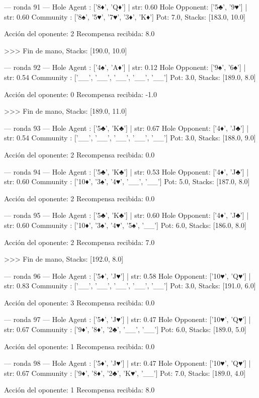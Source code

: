 --- ronda 91 ---
Hole Agent : ['8♦', 'Q♦'] | str: 0.60
Hole Opponent: ['5♣', '9♥'] | str: 0.60
Community  : ['8♠', '5♥', '7♥', '3♦', 'K♦']
Pot: 7.0, Stacks: [183.0, 10.0]

Acción del oponente: 2
Recompensa recibida: 8.0

>>> Fin de mano, Stacks: [190.0, 10.0]


--- ronda 92 ---
Hole Agent : ['4♠', 'A♦'] | str: 0.12
Hole Opponent: ['9♠', '6♠'] | str: 0.54
Community  : ['__', '__', '__', '__', '__']
Pot: 3.0, Stacks: [189.0, 8.0]

Acción del oponente: 0
Recompensa recibida: -1.0

>>> Fin de mano, Stacks: [189.0, 11.0]


--- ronda 93 ---
Hole Agent : ['5♣', 'K♣'] | str: 0.67
Hole Opponent: ['4♦', 'J♣'] | str: 0.54
Community  : ['__', '__', '__', '__', '__']
Pot: 3.0, Stacks: [188.0, 9.0]

Acción del oponente: 2
Recompensa recibida: 0.0

--- ronda 94 ---
Hole Agent : ['5♣', 'K♣'] | str: 0.53
Hole Opponent: ['4♦', 'J♣'] | str: 0.60
Community  : ['10♦', '3♠', '4♥', '__', '__']
Pot: 5.0, Stacks: [187.0, 8.0]

Acción del oponente: 2
Recompensa recibida: 0.0

--- ronda 95 ---
Hole Agent : ['5♣', 'K♣'] | str: 0.60
Hole Opponent: ['4♦', 'J♣'] | str: 0.60
Community  : ['10♦', '3♠', '4♥', '5♠', '__']
Pot: 6.0, Stacks: [186.0, 8.0]

Acción del oponente: 2
Recompensa recibida: 7.0

>>> Fin de mano, Stacks: [192.0, 8.0]


--- ronda 96 ---
Hole Agent : ['5♦', 'J♥'] | str: 0.58
Hole Opponent: ['10♥', 'Q♥'] | str: 0.83
Community  : ['__', '__', '__', '__', '__']
Pot: 3.0, Stacks: [191.0, 6.0]

Acción del oponente: 3
Recompensa recibida: 0.0

--- ronda 97 ---
Hole Agent : ['5♦', 'J♥'] | str: 0.47
Hole Opponent: ['10♥', 'Q♥'] | str: 0.67
Community  : ['9♦', '8♦', '2♣', '__', '__']
Pot: 6.0, Stacks: [189.0, 5.0]

Acción del oponente: 1
Recompensa recibida: 0.0

--- ronda 98 ---
Hole Agent : ['5♦', 'J♥'] | str: 0.47
Hole Opponent: ['10♥', 'Q♥'] | str: 0.67
Community  : ['9♦', '8♦', '2♣', 'K♥', '__']
Pot: 7.0, Stacks: [189.0, 4.0]

Acción del oponente: 1
Recompensa recibida: 8.0

